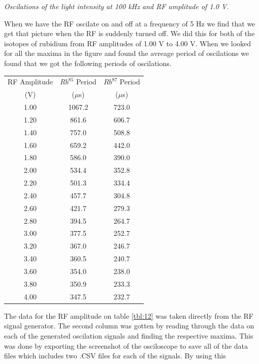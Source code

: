 \documentclass[twocolumn]{article}
\begin{document}
\caption{\textit{Oscilations of the light intensity at 100 kHz and RF 
amplitude of 1.0 V. \\ }}
\justify
When we have the RF oscilate on and off at a frequency of 5 Hz we find that we 
get that picture when the RF is suddenly turned off. We did this for both of 
the isotopes of rubidium from RF amplitudes of 1.00 V to 4.00 V. When we looked 
for all the maxima in the figure and found the avreage period of oscilations 
we found that we got the following periods of oscilations.
\begin{minipage}{\linewidth}
\center
\begin{tabular}{|c|c|c|}
\hline
RF Amplitude & $Rb^{85}$ Period & $Rb^{87}$ Period \\ 
(V) & ($\mu$s) & ($\mu$s) \\ \hline
1.00 & 1067.2 & 723.0 \\ \hline
1.20 & 861.6 & 606.7 \\ \hline
1.40 & 757.0 & 508.8 \\ \hline
1.60 & 659.2 & 442.0 \\ \hline
1.80 & 586.0 & 390.0 \\ \hline
2.00 & 534.4 & 352.8 \\ \hline
2.20 & 501.3 & 334.4 \\ \hline
2.40 & 457.7 & 304.8 \\ \hline
2.60 & 421.7 & 279.3 \\ \hline
2.80 & 394.5 & 264.7 \\ \hline
3.00 & 377.5 & 252.7 \\ \hline
3.20 & 367.0 & 246.7 \\ \hline
3.40 & 360.5 & 240.7 \\ \hline
3.60 & 354.0 & 238.0 \\ \hline
3.80 & 350.9 & 233.3 \\ \hline
4.00 & 347.5 & 232.7 \\ \hline
\end{tabular}
\label{tbl:12}
\end{minipage}
The data for the RF amplitude on table \ref{tbl:12} was taken directly from the 
RF signal generator. The second column was gotten by reading through the data 
on each of the generated oscilation signals and finding the respective maxima. 
This was done by exporting the screenshot of the osciloscope to save all of the 
data files which includes two .CSV files for each of the signals. By using this 
\end{document}
